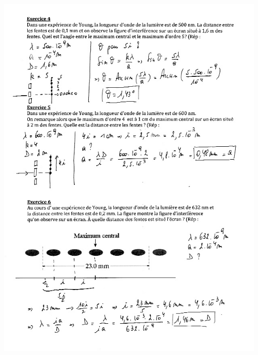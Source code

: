 \includegraphics[width=18.503cm,height=25.663cm]{Pictures/100000010000026E0000035F170A4BD46BAD55A6.png}
